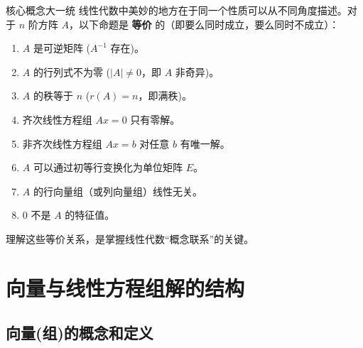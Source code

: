 \documentclass[a4paper,12pt]{ctexart}
\begin{document}
\begin{mythm}{核心概念大一统}{}
线性代数中美妙的地方在于同一个性质可以从不同角度描述。对于 $n$ 阶方阵 $A$，以下命题是 \textbf{等价} 的（即要么同时成立，要么同时不成立）：

\begin{enumerate}
    \item $A$ 是可逆矩阵 ($A^{-1}$ 存在)。
    \item $A$ 的行列式不为零 ($|A| \neq 0$，即 $A$ 非奇异)。
    \item $A$ 的秩等于 $n$ ($r(A) = n$，即满秩)。
    \item 齐次线性方程组 $Ax = 0$ 只有零解。
    \item 非齐次线性方程组 $Ax = b$ 对任意 $b$ 有唯一解。
    \item $A$ 可以通过初等行变换化为单位矩阵 $E$。
    \item $A$ 的行向量组（或列向量组）线性无关。
    \item $0$ 不是 $A$ 的特征值。
\end{enumerate}

理解这些等价关系，是掌握线性代数“概念联系”的关键。
\end{mythm}

\newpage

\section{向量与线性方程组解的结构}

\subsection{向量(组)的概念和定义}
\end{document}
